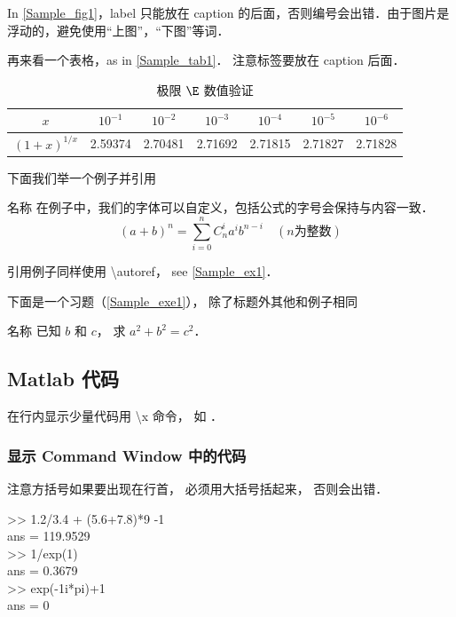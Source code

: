 In \autoref{Sample_fig1}，label 只能放在 caption 的后面，否则编号会出错．由于图片是浮动的，避免使用“上图”，“下图”等词．

再来看一个表格，as in \autoref{Sample_tab1}． 注意标签要放在 caption 后面．
\begin{table}[ht]
\centering
\caption{极限 $\E$ 数值验证}\label{Sample_tab1}
\begin{tabular}{|c|c|c|c|c|c|c|}
\hline
$x$ & ${10^{ - 1}}$ & ${10^{ - 2}}$ & ${10^{ - 3}}$ & ${10^{ - 4}}$ & ${10^{ - 5}}$ & ${10^{ - 6}}$ \\
\hline
$(1 + x)^{1/x}$ & 2.59374 & 2.70481 & 2.71692 & 2.71815 & 2.71827 & 2.71828 \\
\hline
\end{tabular}
\end{table}

下面我们举一个例子并引用

\begin{exam}{名称}\label{Sample_ex1}
在例子中，我们的字体可以自定义，包括公式的字号会保持与内容一致．
\begin{equation}
(a+b)^n = \sum_{i=0}^n C_n^i a^i b^{n-i} \quad (n\text{为整数})
\end{equation}
\end{exam}
引用例子同样使用 \textbackslash autoref， see \autoref{Sample_ex1}． 

下面是一个习题（\autoref{Sample_exe1}）， 除了标题外其他和例子相同
\begin{exer}{名称}\label{Sample_exe1}
已知 $b$ 和 $c$， 求 $a^2 + b^2 = c^2$．
\end{exer}

\subsection{Matlab 代码}
在行内显示少量代码用 \textbackslash x 命令， 如 ．
\subsubsection{显示  Command Window 中的代码}
注意方括号如果要出现在行首， 必须用大括号括起来， 否则会出错．
\begin{Command}
>> 1.2/3.4 + (5.6+7.8)*9 -1 \\
ans = 119.9529 \\
>> 1/exp(1) \\
ans = 0.3679 \\
>> exp(-1i*pi)+1 \\
ans = 0
\end{Command}

